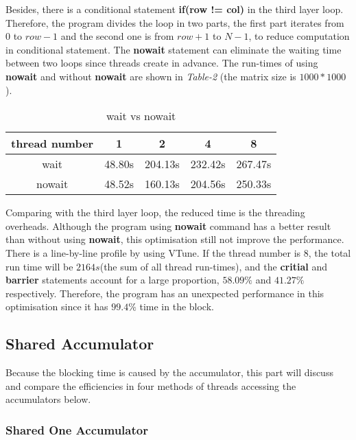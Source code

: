 \documentclass[10pt, a4paper]{article}
\begin{document}
    Besides, there is a conditional statement \textbf{if(row != col)} in the third layer loop. Therefore, the program divides the loop in two parts, the first part iterates from $0$ to $row-1$ and the second one is from $row+1$ to $N-1$, to reduce computation in conditional statement. The \textbf{nowait} statement can eliminate the waiting time between two loops since threads create in advance. The run-times of using \textbf{nowait} and without \textbf{nowait} are shown in \textit{Table-2} (the matrix size is $1000*1000$).
	
	\begin{table}[h!]
    \centering
    \begin{tabular}{ |c|c|c|c|c| } 
     \hline
     thread number   & 1 & 2 & 4 & 8 \\ \hline
     wait   & 48.80s & 204.13s & 232.42s & 267.47s \\ \hline
     nowait & 48.52s & 160.13s & 204.56s & 250.33s \\ \hline
    \end{tabular}
    \caption{wait vs nowait}
    \end{table}
    
    Comparing with the third layer loop, the reduced time is the threading overheads. Although the program using \textbf{nowait} command has a better result than without using \textbf{nowait}, this optimisation still not improve the performance. There is a line-by-line profile by using VTune. If the thread number is $8$, the total run time will be $2164s$(the sum of all thread run-times), and the \textbf{critial} and \textbf{barrier} statements account for a large proportion, $58.09\%$ and $41.27\%$ respectively. Therefore, the program has an unexpected performance in this optimisation since it has $99.4\%$ time in the block.
	
	
	\subsection{Shared Accumulator}
	
    Because the blocking time is caused by the accumulator, this part will discuss and compare the efficiencies in four methods of threads accessing the accumulators below.
	
	\subsubsection{Shared One Accumulator}
	
\end{document}
